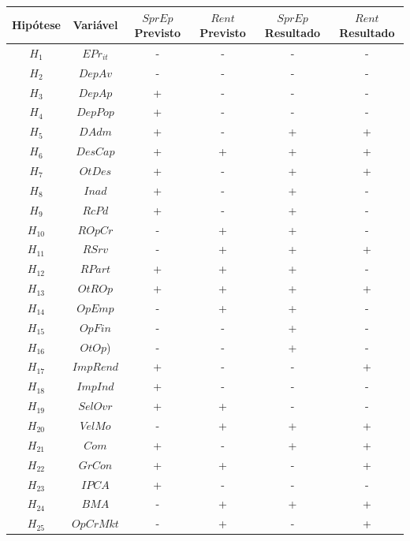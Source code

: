\documentclass[
  12pt,
  12pt,
  openright,
  oneside,
  a4paper,
  chapter=TITLE,
  section=TITLE,
  subsection=TITLE,
  subsubsection=TITLE,
  portugues,
  sumario=tradicional]{abntex2}
\begin{document}
\begin{longtable}[]{@{}cccccc@{}}
\toprule
Hipótese & Variável & \(SprEp\) Previsto & \(Rent\) Previsto & \(SprEp\) Resultado & \(Rent\) Resultado \\
\midrule
\endhead
\(H_{1}\) & \(EPr_{it}\) & - & - & - & - \\
\(H_{2}\) & \(DepAv\) & - & - & - & - \\
\(H_{3}\) & \(DepAp\) & + & - & - & - \\
\(H_{4}\) & \(DepPop\) & + & - & - & - \\
\(H_{5}\) & \(DAdm\) & + & - & + & + \\
\(H_{6}\) & \(DesCap\) & + & + & + & + \\
\(H_{7}\) & \(OtDes\) & + & - & + & + \\
\(H_{8}\) & \(Inad\) & + & - & + & - \\
\(H_{9}\) & \(RcPd\) & + & - & + & - \\
\(H_{10}\) & \(ROpCr\) & - & + & + & - \\
\(H_{11}\) & \(RSrv\) & - & + & + & + \\
\(H_{12}\) & \(RPart\) & + & + & + & - \\
\(H_{13}\) & \(OtROp\) & + & + & + & + \\
\(H_{14}\) & \(OpEmp\) & - & + & + & - \\
\(H_{15}\) & \(OpFin\) & - & - & + & - \\
\(H_{16}\) & \(OtOp\)) & - & - & + & - \\
\(H_{17}\) & \(ImpRend\) & + & - & - & + \\
\(H_{18}\) & \(ImpInd\) & + & - & - & - \\
\(H_{19}\) & \(SelOvr\) & + & + & - & - \\
\(H_{20}\) & \(VelMo\) & - & + & + & + \\
\(H_{21}\) & \(Com\) & + & - & + & + \\
\(H_{22}\) & \(GrCon\) & + & + & - & + \\
\(H_{23}\) & \(IPCA\) & + & - & - & - \\
\(H_{24}\) & \(BMA\) & - & + & + & + \\
\(H_{25}\) & \(OpCrMkt\) & - & + & - & + \\
\bottomrule
\end{longtable}

\vspace{-7mm}

\label{qdr:previsto}
\vspace{20pt}
\end{document}
